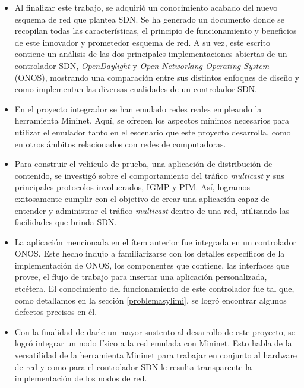 \begin{itemize}

    \item Al finalizar este trabajo, se adquirió un conocimiento acabado del nuevo esquema de red que plantea SDN. Se ha generado un documento donde se recopilan todas las características, el principio de funcionamiento y beneficios de este innovador y prometedor esquema de red. A su vez, este escrito contiene un análisis de las dos principales implementaciones abiertas de un controlador SDN, \textit{OpenDaylight} y \textit{Open Networking Operating System} (ONOS), mostrando una comparación entre sus distintos enfoques de diseño y como implementan las diversas cualidades de un controlador SDN.
    
    \item En el proyecto integrador se han emulado redes reales empleando la herramienta Mininet. Aquí, se ofrecen los aspectos mínimos necesarios para utilizar el emulador tanto en el escenario que este proyecto desarrolla, como en otros ámbitos relacionados con redes de computadoras.

    \item Para construir el vehículo de prueba, una aplicación de distribución de contenido, se investigó sobre el comportamiento del tráfico \textit{multicast} y sus principales protocolos involucrados, IGMP y PIM. Así, logramos exitosamente cumplir con el objetivo  de crear una aplicación capaz de entender y administrar el tráfico \textit{multicast} dentro de una red, utilizando las facilidades que brinda SDN.
    
    \item La aplicación mencionada en el ítem anterior fue integrada en un controlador ONOS. Este hecho indujo a familiarizarse con los detalles específicos de la implementación de ONOS, los componentes que contiene, las interfaces que provee, el flujo de trabajo para insertar una aplicación personalizada, etcétera. El conocimiento del funcionamiento de este controlador fue tal que, como detallamos en la sección \ref{problemasylimi}, se logró encontrar algunos defectos precisos en él.

    \item Con la finalidad de darle un mayor sustento al desarrollo de este proyecto, se logró integrar un nodo físico a la red emulada con Mininet. Esto habla de la versatilidad de la herramienta Mininet para trabajar en conjunto al hardware de red y como para el controlador SDN le resulta transparente la implementación de los nodos de red.

\end{itemize}


